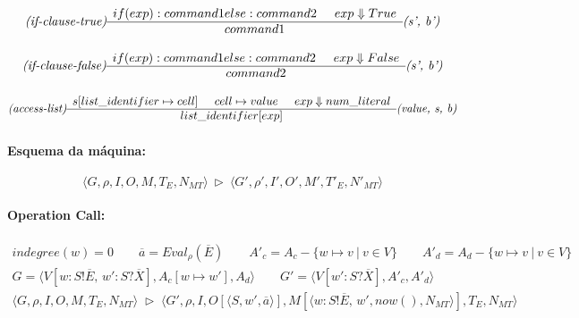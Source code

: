 \documentclass{llncs}
\newcommand{\tuple}[1]{\langle #1 \rangle}
\newcommand{\setof}[1]{\{ #1 \} }
\newcommand{\eval}[2]{\mathit{Eval}_{#1}(#2)}
\def\tr{\rhd}    %
\newcommand{\pfrule}[2]{\begin{array}{c} #1 \\ \hline #2 \end{array}}
\begin{document}
$$
\textit{(if-clause-true)}
\pfrule
{if (exp): command1 else: command2 \hspace{5 mm}  exp \Downarrow True}
{command1}
{\textit{(s', b')}}
$$

$$
\textit{(if-clause-false)}
\pfrule
{if (exp): command1 else: command2 \hspace{5 mm}  exp \Downarrow False}
{command2}
{\textit{(s', b')}}
$$


$$
\textit{(access-list)}
\pfrule
{s[list\_identifier \mapsto cell] \hspace{5 mm} cell \mapsto value \hspace{5 mm} exp \Downarrow num\_literal}
{list\_identifier[exp]}
{\textit{(value, s, b)}}
$$





\newpage
\paragraph{Esquema da máquina:}

$$\tuple{G, \rho, I, O, M, T_E, N_{MT}} \ \tr\ \tuple{G', \rho', I', O', M', T'_E, N'_{MT}}$$





\paragraph{Operation Call:}

$$
\pfrule{
\mathit{indegree}(w) = 0 \qquad 
\overline{a} = \eval{\rho}{\overline{E}} \qquad
A'_c = A_c - \setof{w\mapsto v \ | \ v \in V} \qquad
A'_d = A_d - \setof{w\mapsto v \ | \ v \in V} \\[1mm]
G = \tuple{V[w:S!\overline{E}, \, w' : S?\overline{X}], A_c[w \mapsto w'], A_d} \qquad
G' = \tuple{V[w' : S?\overline{X}], A'_c, A'_d}
}{
\tuple{G,\rho, I, O, M, T_E, N_{MT}}
\; \tr \;
\tuple{G',\rho, I, O[\tuple{S, w', \overline{a}}], M[\tuple{w:S!\overline{E}, \, w', \mathit{now()}, N_{MT}}], T_E, N_{MT}}
}
$$
\end{document}
